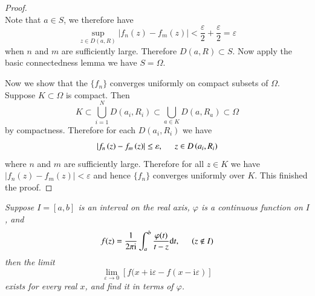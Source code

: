 \begin{proof}
$$$$
Note that $a\in S$, we therefore have 
$$
\mathop {\mathrm{sup}} \limits_{z\in D\left( a,R \right)}\left| f_n\left( z \right) -f_m\left( z \right) \right|<\frac{\varepsilon}{2}+\frac{\varepsilon}{2}=\varepsilon 
$$
when $n$ and $m$ are sufficiently large. Therefore $D(a,R)\subset S$. Now apply the basic connectedness lemma we have $S=\Omega$.\par
Now we show that the $\{f_n\}$ converges uniformly on compact subsets of $\Omega$. Suppose $K\subset\Omega$ is compact. Then 
$$
K\subset \bigcup_{i=1}^N{D\left( a_i,R_i \right)}\subset \bigcup_{a\in K}{D\left( a,R_a \right)}\subset \Omega 
$$
by compactness. Therefore for each $D(a_i,R_i)$ we have 
$$
\left| f_n\left( z \right) -f_m\left( z \right) \right|\le \varepsilon ,\hspace{0.5cm}z\in D\left( a_i,R_i \right) 
$$
where $n$ and $m$ are sufficiently large. Therefore for all $z\in K$ we have $|f_n(z)-f_m(z)|<\varepsilon$ and hence $\{f_n\}$ converges uniformly over $K$. This finished the proof.
\end{proof}
\begin{problem}\em
Suppose $I=[a,b]$ is an interval on the real axis, $\varphi$ is a continuous function on $I$, and 
$$f(z)=\frac{1}{2\pi\mathrm{i}}\int_a^b\frac{\varphi(t)}{t-z}\mathrm{d}t,\hspace{0.5cm}(z\notin I)$$
then the limit 
$$\lim_{\varepsilon\to 0}[f(x+\mathrm{i}\varepsilon-f(x-\mathrm{i}\varepsilon)]$$
exists for every real $x$, and find it in terms of $\varphi$.
\end{problem}
